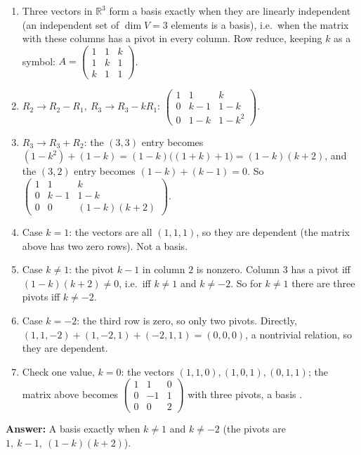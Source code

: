 \documentclass[11pt]{article}
\begin{document}
\begin{tcolorbox}[breakable,colback=ans,colframe=ansb,boxrule=0.5pt,left=4pt,right=4pt,top=2pt,bottom=2pt]\begin{enumerate}[leftmargin=3.1em,itemsep=1pt,topsep=1pt,label=\textbf{Step \arabic*.}]\item Three vectors in $\mathbb{R}^{3}$ form a basis exactly when they are linearly independent (an independent set of $\dim V=3$ elements is a basis), i.e.\ when the matrix with these columns has a pivot in every column. Row reduce, keeping $k$ as a symbol: $A=\begin{pmatrix}1&1&k\\1&k&1\\k&1&1\end{pmatrix}$.
\item $R_2\to R_2-R_1,\ R_3\to R_3-kR_1$: $\begin{pmatrix}1&1&k\\0&k-1&1-k\\0&1-k&1-k^{2}\end{pmatrix}$.
\item $R_3\to R_3+R_2$: the $(3,3)$ entry becomes $(1-k^{2})+(1-k)=(1-k)\bigl((1+k)+1\bigr)=(1-k)(k+2)$, and the $(3,2)$ entry becomes $(1-k)+(k-1)=0$. So $\begin{pmatrix}1&1&k\\0&k-1&1-k\\0&0&(1-k)(k+2)\end{pmatrix}$.
\item Case $k=1$: the vectors are all $(1,1,1)$, so they are dependent (the matrix above has two zero rows). Not a basis.
\item Case $k\neq1$: the pivot $k-1$ in column $2$ is nonzero. Column $3$ has a pivot iff $(1-k)(k+2)\neq0$, i.e.\ iff $k\neq1$ and $k\neq-2$. So for $k\neq1$ there are three pivots iff $k\neq-2$.
\item Case $k=-2$: the third row is zero, so only two pivots. Directly, $(1,1,-2)+(1,-2,1)+(-2,1,1)=(0,0,0)$, a nontrivial relation, so they are dependent.
\item Check one value, $k=0$: the vectors $(1,1,0),(1,0,1),(0,1,1)$; the matrix above becomes $\begin{pmatrix}1&1&0\\0&-1&1\\0&0&2\end{pmatrix}$ with three pivots, a basis \checkmark.
\end{enumerate}\textbf{Answer:} A basis exactly when $k\neq1$ and $k\neq-2$ (the pivots are $1,\ k-1,\ (1-k)(k+2)$).\end{tcolorbox}
\end{document}

